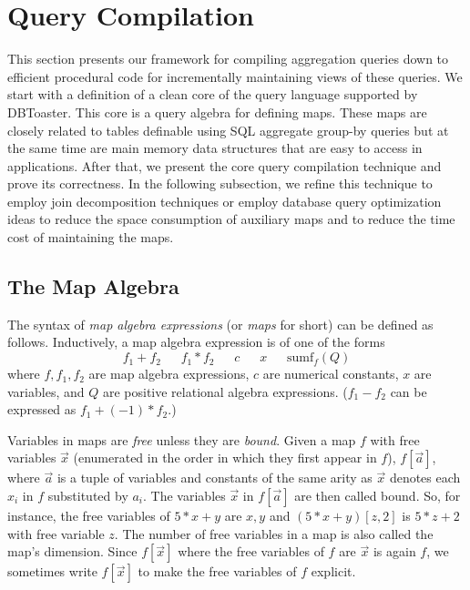 \section{Query Compilation}


\def\algsum{\mathrm{sum}}
\def\algagg{\mathrm{agg}}
\def\algtop{\mathrm{top}}
\def\algtopk{\mathrm{topk}}



This section presents our framework for compiling aggregation queries down to
efficient procedural code for incrementally maintaining views of these queries.
We start with a definition of a clean
core of the query language supported by DBToaster.
This core is a query algebra for defining maps. These maps are closely related to
tables definable using SQL aggregate group-by queries but at the same time are main
memory data structures that are easy to access in applications.
After that, we present the core query compilation technique and prove its correctness.
In the following subsection, we refine this technique to employ join decomposition
techniques or employ database query optimization ideas to reduce the space
consumption of auxiliary maps and to reduce the time cost of maintaining the maps.




\subsection{The Map Algebra}


\def\algsumr{\mbox{sumr}}
\def\algsumf{\mbox{sumf}}
\def\distinct{\mbox{distinct}}
\def\routerjoin{\bowtie\!=}


The syntax of {\em map algebra expressions}\/ (or {\em maps} for short)
can be defined as follows.
Inductively, a map algebra expression is of one of the forms
\[
f_1 + f_2
\quad\;\;
f_1 * f_2
\quad\;\;
c
\quad\;\;
x
\quad\;\;
\algsumf_f(Q)
\]
where $f, f_1, f_2$ are map algebra expressions, $c$ are numerical constants,
$x$ are variables, and $Q$ are positive relational algebra
expressions.
($f_1 - f_2$ can be expressed as $f_1 + (-1) * f_2$.)

Variables in maps are {\em free} unless they are {\em bound}.
Given a map $f$ with free variables $\vec{x}$ (enumerated in the order in which they
first appear in $f$), $f[\vec{a}]$, where $\vec{a}$ is a tuple of variables and constants
of the same arity as $\vec{x}$ denotes each $x_i$ in $f$ substituted by $a_i$. The
variables $\vec{x}$ in $f[\vec{a}]$ are then called bound.
So, for instance, the free variables of $5 * x + y$ are $x,y$ and
$(5 * x + y)[z, 2]$ is $5 * z + 2$ with free variable $z$.
The number of free variables in a map is also called the map's dimension.
Since $f[\vec{x}]$ where the free variables of $f$ are $\vec{x}$ is again $f$, we
sometimes write $f[\vec{x}]$ to make the free variables of $f$ explicit.


